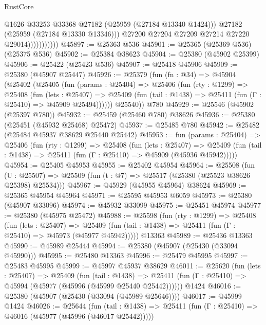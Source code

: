 \begin{lexlean}{RustCore}
\begin{coremodule}
                              @1626
                              @33253
                              @33368
                              @27182
                              (@25959 (@27184 @13340 @1424)))
                            @27182
                            (@25959 (@27184 @13330 @13346)))
                          @27200
                          @27204
                          @27209
                          @27214
                          @27220
                          @29014)))))))))))
@45897 := @25363 @536
@45901 := @25365 (@25369 @536) (@25375 @536)
@45902 := @25384 @38623
@45904 := @25380 (@45902 @25399)
@45906 := @25422 (@25423 @536)
@45907 := @25418 @45906
@45909 := @25380 (@45907 @25447)
@45926 := @25379
    (fun (fn : @34) =>
    @45904
      (@25402
        (@25405
          (fun (params : @25404) =>
          @25406
            (fun (rty : @1299) =>
            @25408
              (fun (lets : @25407) =>
              @25409 (fun (tail : @1438) => @25411 (fun (Γ : @25410) => @45909 @25494))))))
        @25540))
    @780
@45929 := @25546 (@45902 (@25397 @780))
@45932 := @25459 (@25460 @780) @38626
@45936 := @25380 (@25451 (@45932 @25468) @25472)
@45937 := @25485 @780
@45942 := @25482 (@25484 @45937 @38629 @25440 @25442)
@45953 := fun (params : @25404) =>
  @25406
    (fun (rty : @1299) =>
    @25408
      (fun (lets : @25407) =>
      @25409 (fun (tail : @1438) => @25411 (fun (Γ : @25410) => @45909 (@45936 @45942)))))
@45954 := @25405 @45953
@45955 := @25402 @45954
@45964 := @25508
    (fun (U : @25507) => @25509 (fun (t : @7) => @25517 (@25380 (@25523 @38626 @25398) @25534)))
@45967 := @45929 (@45955 @45964) @38624
@45969 := @25365 @45954 @45964
@45971 := @25595 @45953 @6059
@45973 := @25380 (@45907 @33096)
@45974 := @45932 @33099
@45975 := @25451 @45974
@45977 := @25380 (@45975 @25472)
@45988 := @25598
    (fun (rty : @1299) =>
    @25408
      (fun (lets : @25407) =>
      @25409 (fun (tail : @1438) => @25411 (fun (Γ : @25410) => @45973 (@45977 @45942)))))
    @13363
@45989 := @25436 @13363
@45990 := @45989 @25444
@45994 := @25380 (@45907 (@25430 (@33094 @45990)))
@45995 := @25480 @13363
@45996 := @25479 @45995
@45997 := @25483 @45995
@45999 := @45997 @45937 @38629
@46011 := @25620
    (fun (lets : @25407) =>
    @25409
      (fun (tail : @1438) =>
      @25411 (fun (Γ : @25410) => @45994 (@45977 (@45996 (@45999 @25440 @25442))))))
    @1424
@46016 := @25380 (@45907 (@25430 (@33094 (@45989 @25646))))
@46017 := @45999 @1424
@46026 := @25644
    (fun (tail : @1438) => @25411 (fun (Γ : @25410) => @46016 (@45977 (@45996 (@46017 @25442)))))

\end{coremodule}
\end{lexlean}
